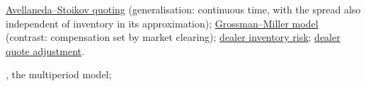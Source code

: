 \begin{qfmodel}
 \hyperref[mod:avellaneda-stoikov]{Avellaneda--Stoikov quoting} (generalisation: continuous time, with the spread also independent of inventory in its approximation); \hyperref[mod:grossman-miller]{Grossman--Miller model} (contrast: compensation set by market clearing); \hyperref[def:dealer-inventory-risk]{dealer inventory risk}; \hyperref[meth:dealer-quote-adjustment]{dealer quote adjustment}.

 \citep{ho-stoll-1981}, the multiperiod model;

\end{qfmodel}
